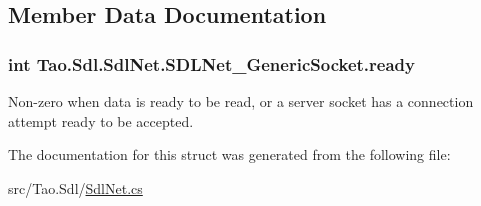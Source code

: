 \subsection{Member Data Documentation}
\hypertarget{struct_tao_1_1_sdl_1_1_sdl_net_1_1_s_d_l_net___generic_socket_afa92dfcd76cd5e28410d90f6ed6514ea}{
\subsubsection[{ready}]{\setlength{\rightskip}{0pt plus 5cm}int {\bf Tao.Sdl.SdlNet.SDLNet\_\-GenericSocket.ready}}}
\label{struct_tao_1_1_sdl_1_1_sdl_net_1_1_s_d_l_net___generic_socket_afa92dfcd76cd5e28410d90f6ed6514ea}


Non-\/zero when data is ready to be read, or a server socket has a connection attempt ready to be accepted. 



The documentation for this struct was generated from the following file:\begin{DoxyCompactItemize}
\item 
src/Tao.Sdl/\hyperlink{_sdl_net_8cs}{SdlNet.cs}\end{DoxyCompactItemize}
